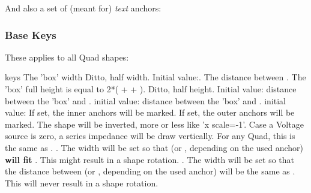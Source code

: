 \documentclass[10pt]{article}
\begin{document}
And also a set of (meant for) \emph{text} anchors:

\begin{center}
\end{center}

        

\subsubsection{Base Keys}\label{quadkeys}
These applies to all Quad shapes:
\begin{describelist*}[30mm]{keys}
    {The 'box' width}
    {Ditto, half width. Initial value:.}
    {The distance between . The 'box' full height is equal to 2*( +  + ).}
   {Ditto, half height. Initial value: }
   {distance between the 'box' and . initial value: }
   {distance between the 'box' and . initial value: }
    {If set, the inner anchors will be marked.}
    {If set, the outer anchors will be marked.}
   {The shape will be inverted, more or less like 'x scale=-1'.}
   {Case a Voltage source is zero, a series impedance will be draw vertically.}
   {For any Quad, this is the same as .}
   {. The width will be set so that  (or , depending on the used anchor) \textbf{will fit} . This might result in a shape rotation.}
   {. The width will be set so that the distance between  (or , depending on the used anchor) will be the same as . This will never result in a shape rotation.} 

\end{describelist*}
\end{document}
